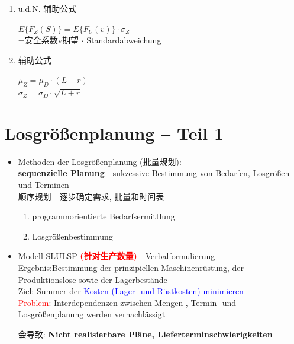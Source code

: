 \documentclass[12pt, letterpaper]{article}
\begin{document}
\begin{CJK*}{UTF8}{gbsn}
\begin{itemize}
\begin{enumerate}
\item u.d.N. 辅助公式
\begin{center}
$E\{F_Z(S)\} = E\{F_U(v)\} \cdot \sigma_Z$\\
=安全系数v期望 $\cdot$ Standardabweichung
\end{center}

\item 辅助公式
\begin{center}
$\mu_Z = \mu_D \cdot (L+r)$\\
$\sigma_Z = \sigma_D \cdot \sqrt{L+r}$
\end{center}





\end{enumerate}


\end{itemize}





\newpage
\section{Losgrößenplanung – Teil 1}
\begin{itemize}
\item Methoden der Losgrößenplanung (批量规划):\\[1mm]
\textbf{sequenzielle Planung} - sukzessive Bestimmung von Bedarfen, Losgrößen und Terminen\\
顺序规划 - 逐步确定需求, 批量和时间表

\begin{enumerate}
\item programmorientierte Bedarfsermittlung
\item Losgrößenbestimmung
\end{enumerate}

\item Modell SLULSP \textbf{\textcolor{red}{(针对生产数量)}} - Verbalformulierung\\[1mm]
Ergebnis:Bestimmung der prinzipiellen Maschinenrüstung, der Produktionslose sowie der Lagerbestände\\
Ziel: Summer der \textcolor{blue}{Kosten (Lager- und Rüstkosten) minimieren}\\[1mm]
\textcolor{red}{Problem}: Interdependenzen zwischen Mengen-, Termin- und Losgrößenplanung werden vernachlässigt

会导致: \textbf{Nicht realisierbare Pläne, Lieferterminschwierigkeiten}



\end{itemize}
\end{CJK*}
\end{document}
